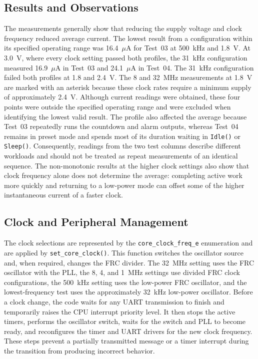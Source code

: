 \documentclass[11pt]{article}
\newcommand{\code}[1]{\texttt{#1}}
\begin{document}
\subsection{Results and Observations}

The measurements generally show that reducing the supply voltage and clock frequency reduced average current. The lowest result from a configuration within its specified operating range was 16.4~$\mu$A for Test~03 at 500~kHz and 1.8~V. At 3.0~V, where every clock setting passed both profiles, the 31~kHz configuration measured 16.9~$\mu$A in Test~03 and 24.1~$\mu$A in Test~04. The 31~kHz configuration failed both profiles at 1.8 and 2.4~V. The 8 and 32~MHz measurements at 1.8~V are marked with an asterisk because these clock rates require a minimum supply of approximately 2.4~V. Although current readings were obtained, these four points were outside the specified operating range and were excluded when identifying the lowest valid result. The profile also affected the average because Test~03 repeatedly runs the countdown and alarm outputs, whereas Test~04 remains in preset mode and spends most of its duration waiting in \code{Idle()} or \code{Sleep()}. Consequently, readings from the two test columns describe different workloads and should not be treated as repeat measurements of an identical sequence. The non-monotonic results at the higher clock settings also show that clock frequency alone does not determine the average: completing active work more quickly and returning to a low-power mode can offset some of the higher instantaneous current of a faster clock.

\subsection{Clock and Peripheral Management}

The clock selections are represented by the \code{core\_clock\_freq\_e} enumeration and are applied by \code{set\_core\_clock()}. This function switches the oscillator source and, when required, changes the FRC divider. The 32~MHz setting uses the FRC oscillator with the PLL, the 8, 4, and 1~MHz settings use divided FRC clock configurations, the 500~kHz setting uses the low-power FRC oscillator, and the lowest-frequency test uses the approximately 32~kHz low-power oscillator. Before a clock change, the code waits for any UART transmission to finish and temporarily raises the CPU interrupt priority level. It then stops the active timers, performs the oscillator switch, waits for the switch and PLL to become ready, and reconfigures the timer and UART drivers for the new clock frequency. These steps prevent a partially transmitted message or a timer interrupt during the transition from producing incorrect behavior.
\end{document}
